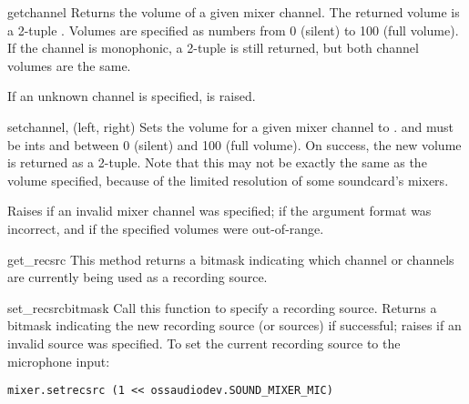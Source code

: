 \begin{methoddesc}{get}{channel}
Returns the volume of a given mixer channel.  The returned volume is a
2-tuple .  Volumes are specified as
numbers from 0 (silent) to 100 (full volume).  If the channel is
monophonic, a 2-tuple is still returned, but both channel volumes are
the same.

If an unknown channel is specified,  is raised.
\end{methoddesc}

\begin{methoddesc}{set}{channel, (left, right)}
Sets the volume for a given mixer channel to .
 and  must be ints and between 0 (silent) and 100
(full volume).  On success, the new volume is returned as a 2-tuple.
Note that this may not be exactly the same as the volume specified,
because of the limited resolution of some soundcard's mixers.

Raises  if an invalid mixer channel was specified;
 if the argument format was incorrect, and
 if the specified volumes were out-of-range.
\end{methoddesc}

\begin{methoddesc}{get_recsrc}{}
This method returns a bitmask indicating which channel or channels are
currently being used as a recording source.
\end{methoddesc}

\begin{methoddesc}{set_recsrc}{bitmask}
Call this function to specify a recording source.  Returns a bitmask
indicating the new recording source (or sources) if successful; raises
 if an invalid source was specified.  To set the current
recording source to the microphone input:

\begin{verbatim}
mixer.setrecsrc (1 << ossaudiodev.SOUND_MIXER_MIC)
\end{verbatim}
\end{methoddesc}



